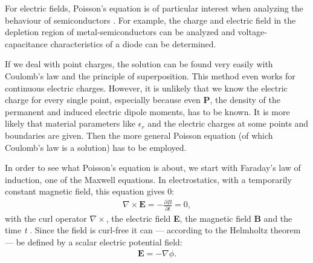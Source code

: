 For electric fields, Poisson's equation is of particular interest when analyzing the behaviour of semiconductors \cite{van2004principles}. For example, the charge and electric field in the depletion region of metal-semiconductors can be analyzed and voltage-capacitance characteristics of a diode can be determined.

If we deal with point charges, the solution can be found very easily with Coulomb's law and the principle of superposition. This method even works for continuous electric charges. However, it is unlikely that we know the electric charge for every single point, especially because even \textbf{P}, the density of the permanent and induced electric dipole moments, has to be known. It is more likely that material parameters like $\epsilon_r$ and the electric charges at some points and boundaries are given. Then the more general Poisson equation (of which Coulomb's law is a solution) has to be employed. 

In order to see what Poisson's equation is about, we start with Faraday's law of induction, one of the Maxwell equations. In electrostatics, with a temporarily constant magnetic field, this equation gives 0:
\begin{gather}
\nabla \times \textbf{E} = -\frac{\partial B}{\partial t} = 0,
\end{gather}
with the curl operator $\nabla \times$, the electric field \textbf{E}, the magnetic field \textbf{B} and the time \textit{t} \cite{prechtl}. Since the field is curl-free it can --- according to the Helmholtz theorem --- be defined by a scalar electric potential field:
\begin{gather}
\textbf{E} = -\nabla \phi.
\label{equ:nabla_phi}
\end{gather}

